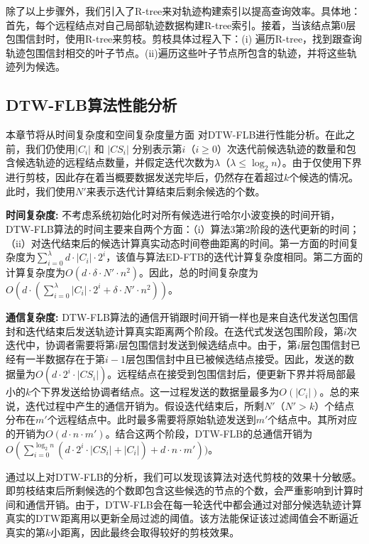 除了以上步骤外，我们引入了R-tree来对轨迹构建索引以提高查询效率。具体地：首先，每个远程结点对自己局部轨迹数据构建R-tree索引。接着，当该结点第$0$层包围信封时，使用R-tree来剪枝。剪枝具体过程入下：(i) 遍历R-tree，找到跟查询轨迹包围信封相交的叶子节点。(ii)遍历这些叶子节点所包含的轨迹，并将这些轨迹列为候选。


 \subsection{DTW-FLB算法性能分析}
 本章节将从时间复杂度和空间复杂度量方面 对DTW-FLB进行性能分析。在此之前，我们仍使用$|C_{i}|$ 和 $|CS_{i}|$ 分别表示第$i$（$i\ge 0$）次迭代前候选轨迹的数量和包含候选轨迹的远程结点数量，并假定迭代次数为$\lambda$（$\lambda \le \log_{2}n$）。由于仅使用下界进行剪枝，因此存在着当概要数据发送完毕后，仍然存在着超过$k$个候选的情况。此时，我们使用$N'$来表示迭代计算结束后剩余候选的个数。
 
 \textbf{时间复杂度:}
 不考虑系统初始化时对所有候选进行哈尔小波变换的时间开销，DTW-FLB算法的时间主要来自两个方面：（i）算法3第2阶段的迭代更新的时间；（ii）对迭代结束后的候选计算真实动态时间卷曲距离的时间。第一方面的时间复杂度为$ \sum_{i=0}^{\lambda}d\cdot |C_{i}| \cdot 2^{i} $，该值与算法ED-FTB的迭代计算复杂度相同。第二方面的计算复杂度为$O(d \cdot \delta \cdot  N' \cdot n^2)$。因此，总的时间复杂度为$O(d \cdot ( \sum_{i=0}^{\lambda}  |C_{i}| \cdot 2^{i}+\delta  \cdot N' \cdot n^2))$。
 
 \textbf{通信复杂度:}
DTW-FLB算法的通信开销跟时间开销一样也是来自迭代发送包围信封和迭代结束后发送轨迹计算真实距离两个阶段。在迭代式发送包围阶段，第$i$次迭代中，协调者需要将第$i$层包围信封发送到候选结点中。由于，第$i$层包围信封已经有一半数据存在于第$i-1$层包围信封中且已被候选结点接受。因此，发送的数据量为$O(d\cdot 2^{i} \cdot |CS_{i}|)$。远程结点在接受到包围信封后，便更新下界并将局部最小的$k$个下界发送给协调者结点。这一过程发送的数据量最多为$O(|C_{i}|)$。总的来说，迭代过程中产生的通信开销为。假设迭代结束后，所剩$N'$（$N'>k$）个结点分布在$m'$个远程结点中。此时最多需要将原始轨迹发送到$m'$个结点中。其所对应的开销为$O(d\cdot n\cdot m')$。结合这两个阶段，DTW-FLB的总通信开销为$O(\sum_{i=0}^{\log_{2}n}(d\cdot 2^{i} \cdot |CS_{i}| + |C_{i}|)+d\cdot n\cdot m'))$。

通过以上对DTW-FLB的分析，我们可以发现该算法对迭代剪枝的效果十分敏感。即剪枝结束后所剩候选的个数即包含这些候选的节点的个数，会严重影响到计算时间和通信开销。由于，DTW-FLB会在每一轮迭代中都会通过对部分候选轨迹计算真实的DTW距离用以更新全局过滤的阈值。该方法能保证该过滤阈值会不断逼近真实的第$k$小距离，因此最终会取得较好的剪枝效果。
 
